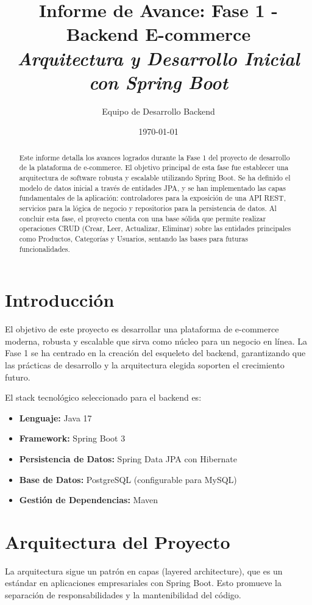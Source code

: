 \documentclass[12pt, a4paper]{article}
\title{
    \Huge\textbf{Informe de Avance: Fase 1 - Backend E-commerce} \\
    \vspace{0.5cm}
    \large\textit{Arquitectura y Desarrollo Inicial con Spring Boot}
}
\author{Equipo de Desarrollo Backend}
\date{\today}
\begin{document}
\maketitle
\thispagestyle{empty}
\newpage

\begin{abstract}
\noindent
Este informe detalla los avances logrados durante la Fase 1 del proyecto de desarrollo de la plataforma de e-commerce. El objetivo principal de esta fase fue establecer una arquitectura de software robusta y escalable utilizando Spring Boot. Se ha definido el modelo de datos inicial a través de entidades JPA, y se han implementado las capas fundamentales de la aplicación: controladores para la exposición de una API REST, servicios para la lógica de negocio y repositorios para la persistencia de datos. Al concluir esta fase, el proyecto cuenta con una base sólida que permite realizar operaciones CRUD (Crear, Leer, Actualizar, Eliminar) sobre las entidades principales como Productos, Categorías y Usuarios, sentando las bases para futuras funcionalidades.
\end{abstract}

\tableofcontents
\newpage

\section{Introducción}
El objetivo de este proyecto es desarrollar una plataforma de e-commerce moderna, robusta y escalable que sirva como núcleo para un negocio en línea. La Fase 1 se ha centrado en la creación del esqueleto del backend, garantizando que las prácticas de desarrollo y la arquitectura elegida soporten el crecimiento futuro.

El stack tecnológico seleccionado para el backend es:
\begin{itemize}
    \item \textbf{Lenguaje:} Java 17
    \item \textbf{Framework:} Spring Boot 3
    \item \textbf{Persistencia de Datos:} Spring Data JPA con Hibernate
    \item \textbf{Base de Datos:} PostgreSQL (configurable para MySQL)
    \item \textbf{Gestión de Dependencias:} Maven
\end{itemize}

\section{Arquitectura del Proyecto}
La arquitectura sigue un patrón en capas (layered architecture), que es un estándar en aplicaciones empresariales con Spring Boot. Esto promueve la separación de responsabilidades y la mantenibilidad del código.
\end{document}
